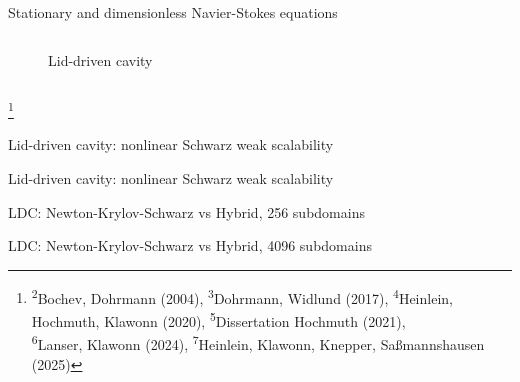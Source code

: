 \begin{frame}{Stationary and dimensionless Navier-Stokes equations}
\begin{columns}
\begin{column}{0.4\textwidth}
\begin{figure}
				\caption{Lid-driven cavity}
			\end{figure}
		\end{column}
	\end{columns}
	{\let\thefootnote\relax\footnote{{\tiny \!\!\!\!\textsuperscript{2}Bochev, Dohrmann (2004),  \textsuperscript{3}Dohrmann, Widlund (2017), \textsuperscript{4}Heinlein, Hochmuth, Klawonn (2020),  \textsuperscript{5}Dissertation Hochmuth (2021),\\\hspace{3em}\!\!\!\!\!\!\textsuperscript{6}Lanser, Klawonn (2024),  \textsuperscript{7}Heinlein, Klawonn, Knepper, Saßmannshausen (2025)}}}
\end{frame}

\begin{frame}{Lid-driven cavity: nonlinear Schwarz weak scalability}
	\begin{figure}
		\centering
		
		\label{fig:weak-scalability-nls}
	\end{figure}
\end{frame}

\begin{frame}{Lid-driven cavity: nonlinear Schwarz weak scalability}
	\begin{figure}
		\centering
		
		\label{fig:weak-scalability-per-iter-nls}
	\end{figure}
\end{frame}

\begin{frame}{LDC: Newton-Krylov-Schwarz vs Hybrid, 256 subdomains}
	\begin{figure}
		\centering
		
		\label{fig:residual-ldc-256}
	\end{figure}
\end{frame}

\begin{frame}{LDC: Newton-Krylov-Schwarz vs Hybrid, 4096 subdomains}
	\begin{figure}
		\centering
		
		\label{fig:residual-ldc-4096}
	\end{figure}
\end{frame}

